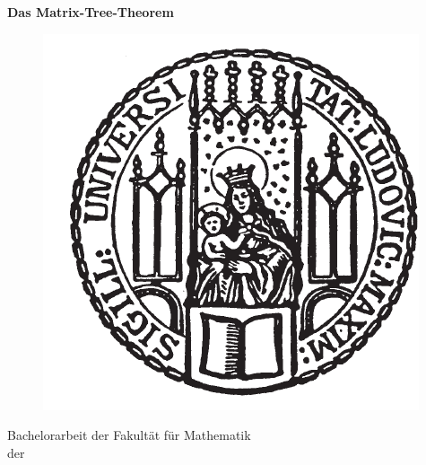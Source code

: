 \documentclass[11pt,a4paper,twoside, draft]{article}%
\begin{document}
\lhead[\fancyplain{}{\thepage}]{\fancyplain{}{\rightmark}}
\rhead[\fancyplain{}{\leftmark}]{\fancyplain{}{\thepage}}
\cfoot{}
\begin{titlepage}
\begin{center}
\vspace*{0.65cm}
\huge{}
\setcounter{page}{1}
\hspace*{-0.73cm}
\textbf{Das Matrix-Tree-Theorem}\\
\vspace*{2.2cm}

\begin{figure}[h]
	\begin{center}
		\hspace*{-0.73cm}
		\includegraphics{lmu_siegel}
	\end{center}
\end{figure}
\vspace*{0.5cm}
\Large
\hspace*{-0.73cm}
\hspace*{-0.5cm}Bachelorarbeit der Fakultät für Mathematik\\
\vspace*{0.1cm}
\hspace*{-0.73cm}
\hspace*{-0.5cm}der\\
\vspace*{0.1cm}

\end{center}
\end{titlepage}
\end{document}
